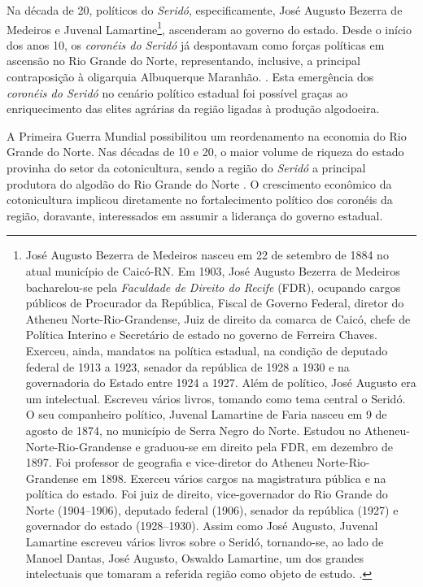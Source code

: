 \begin{refsection}
    Na década de 20, políticos do \textit{Seridó}, especificamente, José Augusto Bezerra de Medeiros e Juvenal Lamartine\footnote{José Augusto Bezerra de Medeiros nasceu em 22 de setembro de 1884 no atual município de Caicó-RN. Em 1903, José Augusto Bezerra de Medeiros bacharelou-se pela \textit{Faculdade de Direito do Recife} (FDR), ocupando cargos públicos de Procurador da República, Fiscal de Governo Federal, diretor do Atheneu Norte-Rio-Grandense, Juiz de direito da comarca de Caicó, chefe de Política Interino e Secretário de estado no governo de Ferreira Chaves. Exerceu, ainda, mandatos na política estadual, na condição de deputado federal de 1913 a 1923, senador da república de 1928 a 1930 e na governadoria do Estado entre 1924 a 1927. Além de político, José Augusto era um intelectual. Escreveu vários livros, tomando como tema central o Seridó. O seu companheiro político, Juvenal Lamartine de Faria nasceu em 9 de agosto de 1874, no município de Serra Negro do Norte. Estudou no Atheneu-Norte-Rio-Grandense e graduou-se em direito pela FDR, em dezembro de 1897. Foi professor de geografia e vice-diretor do Atheneu Norte-Rio-Grandense em 1898. Exerceu vários cargos na magistratura pública e na política do estado. Foi juiz de direito, vice-governador do Rio Grande do Norte (1904--1906), deputado federal (1906), senador da república (1927) e governador do estado (1928--1930). Assim como José Augusto, Juvenal Lamartine escreveu vários livros sobre o Seridó, tornando-se, ao lado de Manoel Dantas, José Augusto, Oswaldo Lamartine, um dos grandes intelectuais que tomaram a referida região como objeto de estudo. \cite{MedeirosNeta2007Serido}.}, ascenderam ao governo do estado. Desde o início dos anos 10, os \textit{coronéis do Seridó} já despontavam como forças políticas em ascensão no Rio Grande do Norte, representando, inclusive, a principal contraposição à oligarquia Albuquerque Maranhão. \cite[p.~209]{Macedo2012Penultima}. Esta emergência dos \textit{coronéis do Seridó} no cenário político estadual foi possível graças ao enriquecimento das elites agrárias da região ligadas à produção algodoeira.   

    A Primeira Guerra Mundial possibilitou um reordenamento na economia do Rio Grande do Norte. Nas décadas de 10 e 20, o maior volume de riqueza do estado provinha do setor da cotonicultura, sendo a região do \textit{Seridó} a principal produtora do algodão do Rio Grande do Norte \cite[p.~50]{Spinelli1996Getulio}. O crescimento econômico da cotonicultura implicou diretamente no fortalecimento político dos coronéis da região, doravante, interessados em assumir a liderança do governo estadual.  


\end{refsection}
